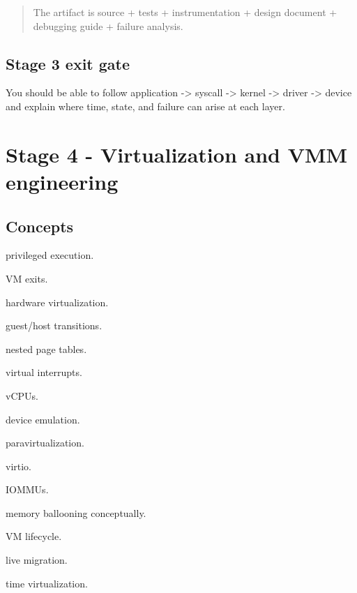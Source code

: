 \documentclass[11pt,letterpaper]{article}
\begin{document}
\begin{quote}
The artifact is source + tests + instrumentation + design document + debugging guide + failure analysis.
\end{quote}

\subsection*{Stage 3 exit gate}

You should be able to follow application -> syscall -> kernel -> driver -> device and explain where time, state, and failure can arise at each layer.

\section{Stage 4 - Virtualization and VMM engineering}\label{sec:8}

\label{stage:4}

\subsection*{Concepts}

\begin{topics}

\item privileged execution.

\item VM exits.

\item hardware virtualization.

\item guest/host transitions.

\item nested page tables.

\item virtual interrupts.

\item vCPUs.

\item device emulation.

\item paravirtualization.

\item virtio.

\item IOMMUs.

\item memory ballooning conceptually.

\item VM lifecycle.

\item live migration.

\item time virtualization.

\end{topics}
\end{document}

